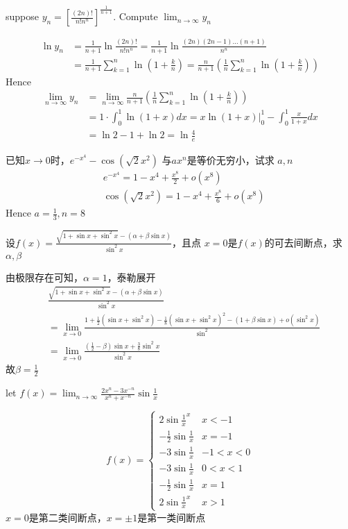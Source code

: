 \documentclass{article}
\begin{document}
\begin{examplle}[]
suppose \(\displaystyle y_n=\left[\frac{(2n)!}{n!n^n}\right]^{\frac{1}{n+1}}\). Compute
\(\lim_{n\to\infty}y_n\)

\begin{align*}
\ln y_n&=\frac{1}{n+1}\ln\frac{(2n)!}{n!n^n}=
\frac{1}{n+1}\ln\frac{(2n)(2n-1)\dots(n+1)}{n^n}\\
&=\frac{1}{n+1}\sum_{k=1}^n\ln(1+\frac{k}{n})=
\frac{n}{n+1}\left(
\frac{1}{n}\sum_{k=1}^n\ln(1+\frac{k}{n})
\right)
\end{align*}
Hence
\begin{align*}
\lim_{n\to\infty}y_n&=\lim_{n\to\infty}\frac{n}{n+1}\left(
\frac{1}{n}\sum_{k=1}^n\ln(1+\frac{k}{n})
\right)\\
&=1\cdot\int_0^1\ln(1+x)dx=
x\ln(1+x)\rvert_0^1-\int_0^1\frac{x}{1+x}dx\\
&=\ln2-1+\ln2=\ln\frac{4}{e}
\end{align*}
\end{examplle}

\begin{examplle}[]
已知\(x\to0\)时，\(e^{-x^4}-\cos(\sqrt{2}x^2)\) 与\(ax^n\)是等价无穷小，试求
\(a,n\)
\begin{align*}
&e^{-x^4}=1-x^4+\frac{x^8}{2}+o(x^8)\\
&\cos(\sqrt{2}x^2)=1-x^4+\frac{x^8}{6}+o(x^8)
\end{align*}
Hence \(a=\frac{1}{3},n=8\)
\end{examplle}

\begin{examplle}[]
设\(\displaystyle f(x)=\frac{\sqrt{1+\sin x+\sin^2x}-(\alpha+\beta\sin x)}{\sin^2x}\)，且点
\(x=0\)是\(f(x)\)的可去间断点，求\(\alpha,\beta\)

由极限存在可知，\(\alpha=1\)，泰勒展开
\begin{align*}
&\frac{\sqrt{1+\sin x+\sin^2x}-(\alpha+\beta\sin x)}{\sin^2x}\\
&=\lim_{x\to0}\frac{1+\frac{1}{2}(\sin x+\sin^2x)-\frac{1}{8}(\sin x+\sin^2x)^2-(1+\beta\sin x)
+o(\sin^2x)}{\sin^2}\\
&=\lim_{x\to0}\frac{(\frac{1}{2}-\beta)\sin x+\frac{3}{8}\sin^2x}{\sin^2x}
\end{align*}
故\(\beta=\frac{1}{2}\)
\end{examplle}

\begin{examplle}[]
let \(\displaystyle f(x)=\lim_{n\to\infty}\frac{2x^n-3x^{-n}}{x^n+x^{-n}}\sin\frac{1}{x}\)

\begin{equation*}
f(x)=
\begin{cases}
2\sin\frac{1}{x}^x&x<-1\\
-\frac{1}{2}\sin\frac{1}{x}&x=-1\\
-3\sin\frac{1}{x}&-1<x<0\\
-3\sin\frac{1}{x}&0<x<1\\
-\frac{1}{2}\sin\frac{1}{x}&x=1\\
2\sin\frac{1}{x}^x&x>1
\end{cases}
\end{equation*}
\(x=0\)是第二类间断点，\(x=\pm1\)是第一类间断点
\end{examplle}
\end{document}
